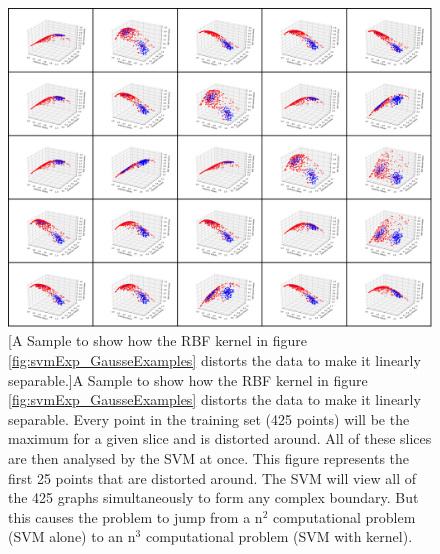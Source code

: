 \begin{figure}[!h]
 \centering
 \includegraphics[width=\linewidth]{Appendix1/Figs/25OutOf425kSamples.png}
 [A Sample to show how the RBF kernel in figure \ref{fig:svmExp_GausseExamples} distorts the data to make it linearly separable.]{A Sample to show how the RBF kernel in figure \ref{fig:svmExp_GausseExamples} distorts the data to make it linearly separable. Every point in the training set (425 points) will be the maximum for a given slice and is distorted around. All of these slices are then analysed by the SVM at once. This figure represents the first 25 points that are distorted around. The SVM will view all of the 425 graphs simultaneously to form any complex boundary. But this causes the problem to jump from a n$^2$ computational problem (SVM alone) to an n$^3$ computational problem (SVM with kernel). } 
 \label{fig:25OutOf425kSamples}
\end{figure}

